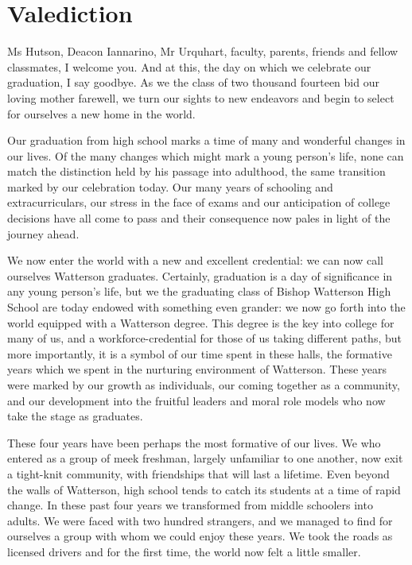\documentclass{report}
\begin{document}
\section*{Valediction}

Ms Hutson, Deacon Iannarino, Mr Urquhart, faculty, parents, friends and fellow
classmates, I welcome you. And at this, the day on which we celebrate our
graduation, I say goodbye. As we the class of two thousand fourteen bid our
loving mother farewell, we turn our sights to new endeavors and begin to select
for ourselves a new home in the world.

Our graduation from high school marks a time of many and wonderful changes in
our lives. Of the many changes which might mark a young person's life, none can
match the distinction held by his passage into adulthood, the same transition
marked by our celebration today. Our many years of schooling and
extracurriculars, our stress in the face of exams and our anticipation of
college decisions have all come to pass and their consequence now pales in light
of the journey ahead. 

We now enter the world with a new and excellent credential: we can now call
ourselves Watterson graduates. Certainly, graduation is a day of significance
in any young person's life, but we the graduating class of Bishop Watterson
High School are today endowed with something even grander: we now go forth into
the world equipped with a Watterson degree. This degree is the key into college
for many of us, and a workforce-credential for those of us taking different
paths, but more importantly, it is a symbol of our time spent in these halls,
the formative years which we spent in the nurturing environment of Watterson.
These years were marked by our growth as individuals, our coming together as a
community, and our development into the fruitful leaders and moral role models
who now take the stage as graduates.

These four years have been perhaps the most formative of our lives. We who
entered as a group of meek freshman, largely unfamiliar to one another, now
exit a tight-knit community, with friendships that will last a lifetime. Even
beyond the walls of Watterson, high school tends to catch its students at a
time of rapid change. In these past four years we transformed from middle
schoolers into adults. We were faced with two hundred strangers, and we managed
to find for ourselves a group with whom we could enjoy these years. We took the
roads as licensed drivers and for the first time, the world now felt a little
smaller.
\end{document}

